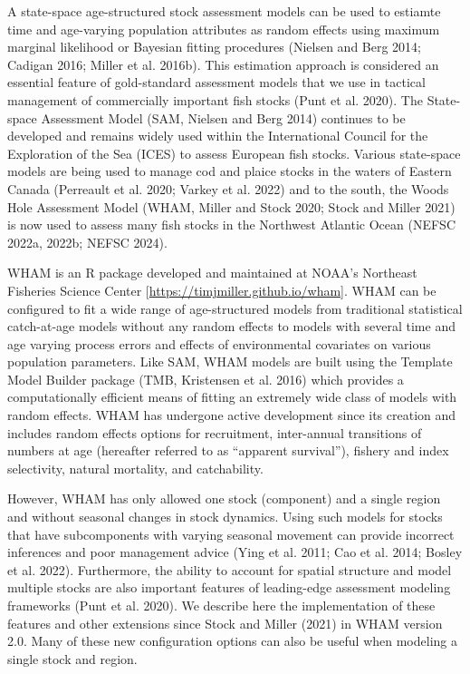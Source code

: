 \documentclass[
]{article}
\begin{document}
A state-space age-structured stock assessment models can be used to
estiamte time and age-varying population attributes as random effects
using maximum marginal likelihood or Bayesian fitting procedures
(Nielsen and Berg 2014; Cadigan 2016; Miller et al. 2016b). This
estimation approach is considered an essential feature of gold-standard
assessment models that we use in tactical management of commercially
important fish stocks (Punt et al. 2020). The State-space Assessment
Model (SAM, Nielsen and Berg 2014) continues to be developed and remains
widely used within the International Council for the Exploration of the
Sea (ICES) to assess European fish stocks. Various state-space models
are being used to manage cod and plaice stocks in the waters of Eastern
Canada (Perreault et al. 2020; Varkey et al. 2022) and to the south, the
Woods Hole Assessment Model (WHAM, Miller and Stock 2020; Stock and
Miller 2021) is now used to assess many fish stocks in the Northwest
Atlantic Ocean (NEFSC 2022a, 2022b; NEFSC 2024).

WHAM is an R package developed and maintained at NOAA's Northeast
Fisheries Science Center {[}\url{https://timjmiller.github.io/wham}{]}.
WHAM can be configured to fit a wide range of age-structured models from
traditional statistical catch-at-age models without any random effects
to models with several time and age varying process errors and effects
of environmental covariates on various population parameters. Like SAM,
WHAM models are built using the Template Model Builder package (TMB,
Kristensen et al. 2016) which provides a computationally efficient means
of fitting an extremely wide class of models with random effects. WHAM
has undergone active development since its creation and includes random
effects options for recruitment, inter-annual transitions of numbers at
age (hereafter referred to as ``apparent survival''), fishery and index
selectivity, natural mortality, and catchability.

However, WHAM has only allowed one stock (component) and a single region
and without seasonal changes in stock dynamics. Using such models for
stocks that have subcomponents with varying seasonal movement can
provide incorrect inferences and poor management advice (Ying et al.
2011; Cao et al. 2014; Bosley et al. 2022). Furthermore, the ability to
account for spatial structure and model multiple stocks are also
important features of leading-edge assessment modeling frameworks (Punt
et al. 2020). We describe here the implementation of these features and
other extensions since Stock and Miller (2021) in WHAM version 2.0. Many
of these new configuration options can also be useful when modeling a
single stock and region.
\end{document}
